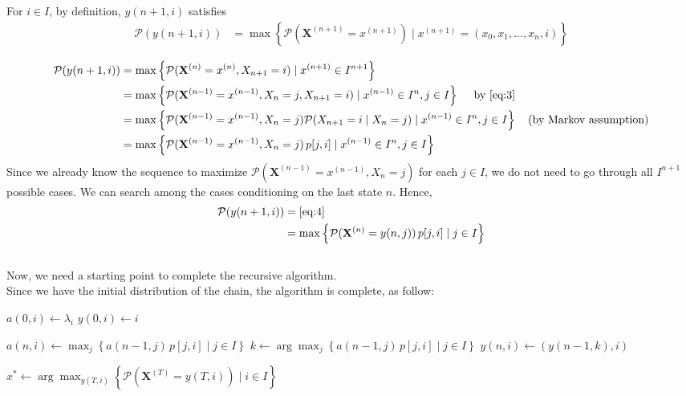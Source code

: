 \documentclass{article}
\begin{document}
For $i\in I$, by definition, $y(n+1,i)$ satisfies
\begin{align}
    \mathcal{P}(y(n+1, i)) &= \max\left\{\mathcal{P}(\mathbf{X}^{(n+1)}=x^{(n+1)})\mid x^{(n+1)}=(x_0,x_1,\dotsc,x_n,i)\right\}
\end{align}

\begin{align}
    \mathcal{P}(y(n+1, i)) &= \max\left\{\mathcal{P}(\mathbf{X}^{(n)}=x^{(n)}, X_{n+1}=i)\mid x^{(n+1)}\in I^{n+1}\right\} \nonumber\\
    &= \max \left\{\mathcal{P}(\mathbf{X}^{(n-1)}=x^{(n-1)},X_n=j,X_{n+1}=i)\mid x^{(n-1)}\in I^{n}, j\in I \right\} \quad\text{ by \eqref{eq:3}}\nonumber\\
    &= \max \left\{\mathcal{P}(\mathbf{X}^{(n-1)}=x^{(n-1)},X_n=j)\mathcal{P}(X_{n+1}=i\mid X_n=j) \mid x^{(n-1)}\in I^{n}, j\in I \right\} \quad\text{(by Markov assumption)} \nonumber\\
    &= \max \left\{\mathcal{P}(\mathbf{X}^{(n-1)}=x^{(n-1)},X_n=j)\, p[j,i] \mid x^{(n-1)}\in I^{n}, j\in I \right\} \label{eq:4}
\end{align}
Since we already know the sequence to maximize $\mathcal{P}(\mathbf{X}^{(n-1)}=x^{(n-1)},X_n=j)$ for each $j\in I$, 
we do not need to go through all $I^{n+1}$ possible cases. We can search among the cases conditioning on the last state $n$. Hence,
\begin{align}
    \mathcal{P}(y(n+1, i)) &= \eqref{eq:4} \nonumber\\
    &= \max\left\{\mathcal{P}(\mathbf{X}^{(n)}=y(n,j))\,p[j,i] \mid j\in I \right\}
\end{align}
$ $\\
Now, we need a starting point to complete the recursive algorithm. \\
Since we have the initial distribution of the chain, 
the algorithm is complete, as follow:
\begin{algorithm}[H]
    \begin{algorithmic}
            \State $a(0,i)\gets \lambda_i$
            \State $y(0,i)\gets i$
        \EndFor
    \end{algorithmic}
    \begin{algorithmic}
                \State $\displaystyle a(n,i)\gets \max_{j}\left\{a(n-1,j)\,p[j,i]\mid j\in I \right\}$
                \State $\displaystyle k\gets \arg\max_{j}\left\{a(n-1,j)\,p[j,i]\mid j\in I \right\}$
                \State $y(n,i)\gets (y(n-1,k),i)$
            \EndFor
        \EndFor
    \end{algorithmic}
    \begin{algorithmic}
        \State $\displaystyle x^*\gets \arg\max_{y(T,i)}\left\{\mathcal{P}(\mathbf{X}^{(T)}=y(T,i)) \mid i\in I\right\}$
    \end{algorithmic}
\end{algorithm}
\end{document}

